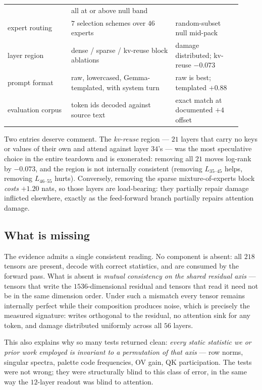 \begin{table}[h]
\begin{tabular}{>{\raggedright\arraybackslash}p{0.25\linewidth}>{\raggedright\arraybackslash}p{0.41\linewidth}>{\raggedright\arraybackslash}p{0.26\linewidth}}
& all at or above null band \\
expert routing & $7$ selection schemes over $46$ experts
& random-subset null mid-pack \\
layer region & dense / sparse / kv-reuse block ablations
& damage distributed; kv-reuse $-0.073$ \\
prompt format & raw, lowercased, Gemma-templated, with system turn
& raw is best; templated $+0.88$ \\
evaluation corpus & token ids decoded against source text
& exact match at documented $+4$ offset \\
\bottomrule
\end{tabular}
\end{table}

Two entries deserve comment. The \emph{kv-reuse} region --- $21$ layers that carry no keys or
values of their own and attend against layer $34$'s --- was the most speculative choice in the
entire teardown and is exonerated: removing all $21$ moves log-rank by $-0.073$, and the region is
not internally consistent (removing $L_{35\text{--}45}$ helps, removing $L_{46\text{--}55}$ hurts).
Conversely, removing the sparse mixture-of-experts block \emph{costs} $+1.20$ nats, so those layers
are load-bearing: they partially repair damage inflicted elsewhere, exactly as the feed-forward
branch partially repairs attention damage.

\subsection{What is missing}

The evidence admits a single consistent reading. No component is absent: all $218$ tensors are
present, decode with correct statistics, and are consumed by the forward pass. What is absent is
\emph{mutual consistency on the shared residual axis} --- tensors that write the $1536$-dimensional
residual and tensors that read it need not be in the same dimension order. Under such a mismatch
every tensor remains internally perfect while their composition produces noise, which is precisely
the measured signature: writes orthogonal to the residual, no attention sink for any token, and
damage distributed uniformly across all $56$ layers.

This also explains why so many tests returned clean: \emph{every static statistic we or prior work
employed is invariant to a permutation of that axis} --- row norms, singular spectra, palette code
frequencies, OV gain, QK participation. The tests were not wrong; they were structurally blind to
this class of error, in the same way the $12$-layer readout was blind to attention.

